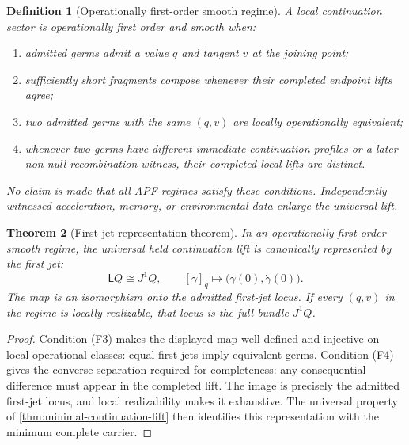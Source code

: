 \documentclass[11pt]{article}
\newtheorem{theorem}{Theorem}[section]
\newtheorem{definition}[theorem]{Definition}
\theoremstyle{remark}
\begin{document}
\begin{definition}[Operationally first-order smooth regime]\label{def:first-order-regime}
A local continuation sector is \emph{operationally first order and smooth} when:
\begin{enumerate}[label=(F\arabic*)]
\item admitted germs admit a value $q$ and tangent $v$ at the joining point;
\item sufficiently short fragments compose whenever their completed endpoint lifts agree;
\item two admitted germs with the same $(q,v)$ are locally operationally equivalent;
\item whenever two germs have different immediate continuation profiles or a later non-null recombination witness, their completed local lifts are distinct.
\end{enumerate}
No claim is made that all APF regimes satisfy these conditions.  Independently witnessed acceleration, memory, or environmental data enlarge the universal lift.
\end{definition}

\begin{theorem}[First-jet representation theorem]\label{thm:first-jet-representation}
In an operationally first-order smooth regime, the universal held continuation lift is canonically represented by the first jet:
\[
        \mathsf LQ\cong J^1Q,
        \qquad
        [\gamma]_q\longmapsto \bigl(\gamma(0),\dot\gamma(0)\bigr).
\]
The map is an isomorphism onto the admitted first-jet locus.  If every $(q,v)$ in the regime is locally realizable, that locus is the full bundle $J^1Q$.
\end{theorem}

\begin{proof}
Condition (F3) makes the displayed map well defined and injective on local operational classes: equal first jets imply equivalent germs.  Condition (F4) gives the converse separation required for completeness: any consequential difference must appear in the completed lift.  The image is precisely the admitted first-jet locus, and local realizability makes it exhaustive.  The universal property of \cref{thm:minimal-continuation-lift} then identifies this representation with the minimum complete carrier.
\end{proof}
\end{document}
